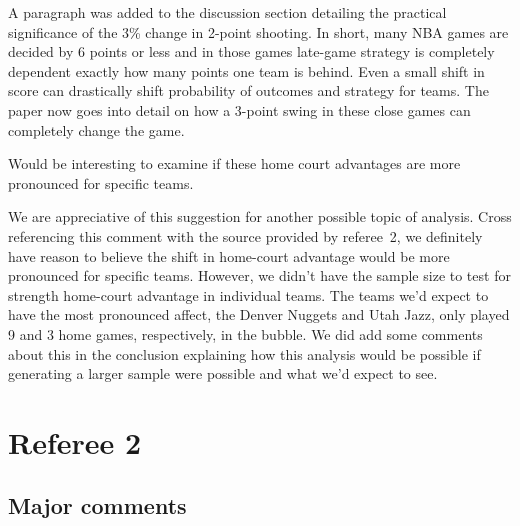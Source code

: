 \documentclass[12pt]{article}
\newenvironment{comment}%
{\begin{quoting}\noindent\small\it\ignorespaces%
  }{\end{quoting}}
\begin{document}
 A paragraph was added to the discussion section detailing the practical significance of the 3\% change in 2-point shooting. In short, many NBA games are decided by 6 points or less and in those games late-game strategy is completely dependent exactly how many points one team is behind. Even a small shift in score can drastically shift probability of outcomes and strategy for teams. The paper now goes into detail on how a 3-point swing in these close games can completely change the game.

\begin{comment}
Would be interesting to examine if these home court advantages are more pronounced for specific teams.
\end{comment}

 We are appreciative of this suggestion for another possible topic of analysis. Cross referencing this comment with the source provided by referee~2, we definitely have reason to believe the shift in home-court advantage would be more pronounced for specific teams. However, we didn't have the sample size to test for strength home-court advantage in individual teams. The teams we'd expect to have the most pronounced affect, the Denver Nuggets and Utah Jazz, only played 9 and 3 home games, respectively, in the bubble. We did add some comments about this in the conclusion explaining how this analysis would be possible if generating a larger sample were possible and what we'd expect to see.


\section*{Referee 2}

\subsection*{Major comments}
\end{document}
